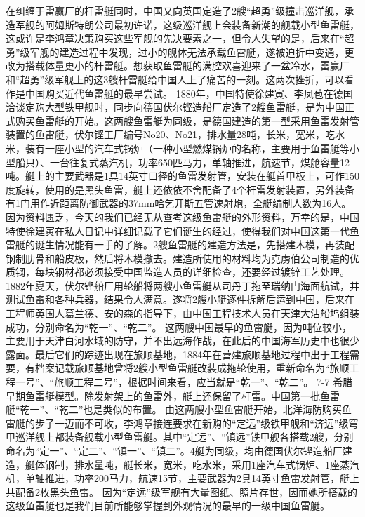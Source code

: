 \documentclass[12pt,UTF8]{ctexbook}
\begin{document}
在纠缠于雷赢厂的杆雷艇同时，中国又向英国定造了2艘“超勇”级撞击巡洋舰，承造军舰的阿姆斯特朗公司最初许诺，这级巡洋舰上会装备新潮的舰载小型鱼雷艇，这或许是李鸿章决策购买这些军舰的先决要素之一，但令人失望的是，后来在“超勇”级军舰的建造过程中发现，过小的舰体无法承载鱼雷艇，遂被迫折中变通，更改为搭载体量更小的杆雷艇。想获取鱼雷艇的满腔欢喜迎来了一盆冷水，雷赢厂和“超勇”级军舰上的这3艘杆雷艇给中国人上了痛苦的一刻。这两次挫折，可以看作是中国购买近代鱼雷艇的最早尝试。
1880年，中国特使徐建寅、李凤苞在德国洽谈定购大型铁甲舰时，同步向德国伏尔铿造船厂定造了2艘鱼雷艇，是为中国正式购买鱼雷艇的开始。这两艘鱼雷艇为同级，是德国建造的第一型采用鱼雷发射管装置的鱼雷艇，伏尔铿工厂编号No20、No21，排水量28吨，长米，宽米，吃水米，装有一座小型的汽车式锅炉（一种小型燃煤锅炉的名称，主要用于鱼雷艇等小型船只）、一台往复式蒸汽机，功率650匹马力，单轴推进，航速节，煤舱容量12吨。艇上的主要武器是1具14英寸口径的鱼雷发射管，安装在艇首甲板上，可作150度旋转，使用的是黑头鱼雷，艇上还依依不舍配备了4个杆雷发射装置，另外装备有1门用作近距离防御武器的37mm哈乞开斯五管速射炮，全艇编制人数为16人。 因为资料匮乏，今天的我们已经无从查考这级鱼雷艇的外形资料，万幸的是，中国特使徐建寅在私人日记中详细记载了它们诞生的经过，使得我们对中国这第一代鱼雷艇的诞生情况能有一手的了解。2艘鱼雷艇的建造方法是，先搭建木模，再装配钢制肋骨和船皮板，然后将木模撤去。建造所使用的材料均为克虏伯公司制造的优质钢，每块钢材都必须接受中国监造人员的详细检查，还要经过镀锌工艺处理。1882年夏天，伏尔铿船厂用轮船将两艘小鱼雷艇从司丹丁拖至瑞纳门海面航试，并测试鱼雷和各种兵器，结果令人满意。遂将2艘小艇逐件拆解后运到中国，后来在工程师英国人葛兰德、安的森的指导下，由中国工程技术人员在天津大沽船坞组装成功，分别命名为“乾一”、“乾二”。 这两艘中国最早的鱼雷艇，因为吨位较小，主要用于天津白河水域的防守，并不出远海作战，在此后的中国海军历史中也很少露面。最后它们的踪迹出现在旅顺基地，1884年在营建旅顺基地过程中出于工程需要，有档案记载旅顺基地曾将2艘小型鱼雷艇改装成拖轮使用，重新命名为“旅顺工程一号”、“旅顺工程二号”，根据时间来看，应当就是“乾一”、“乾二”。
7-7
希腊早期鱼雷艇模型。除发射架上的鱼雷外，艇上还保留了杆雷。中国第一批鱼雷艇“乾一”、“乾二”也是类似的布置。
由这两艘小型鱼雷艇开始，北洋海防购买鱼雷艇的步子一迈而不可收，李鸿章接连要求在新购的“定远”级铁甲舰和“济远”级穹甲巡洋舰上都装备舰载小型鱼雷艇。其中“定远”、“镇远”铁甲舰各搭载2艘，分别命名为“定一”、“定二”、“镇一”、“镇二”。4艇为同级，均由德国伏尔铿造船厂建造，艇体钢制，排水量吨，艇长米，宽米，吃水米，采用1座汽车式锅炉、1座蒸汽机，单轴推进，功率200马力，航速15节，主要武器为2具14英寸鱼雷发射管，艇上共配备2枚黑头鱼雷。 因为“定远”级军舰有大量图纸、照片存世，因而她所搭载的这级鱼雷艇也是我们目前所能够掌握到外观情况的最早的一级中国鱼雷艇。
\end{document}
